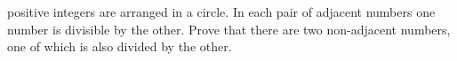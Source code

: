  positive integers are arranged in a circle.
In each pair of adjacent numbers one number is divisible by the other.
Prove that there are two non-adjacent numbers, one of which is also divided by
the other.

\solution

\endproblem
